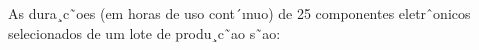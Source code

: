 \question As dura¸c˜oes (em horas de uso cont´ınuo) de 25 componentes eletrˆonicos selecionados de um
lote de produ¸c˜ao s˜ao: